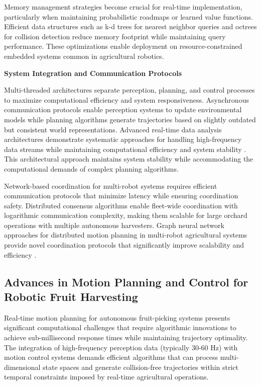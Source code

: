 \documentclass{ieeeaccess}
\begin{document}
Memory management strategies become crucial for real-time implementation, particularly when maintaining probabilistic roadmaps or learned value functions. Efficient data structures such as k-d trees for nearest neighbor queries and octrees for collision detection reduce memory footprint while maintaining query performance. These optimizations enable deployment on resource-constrained embedded systems common in agricultural robotics.

\textbf{System Integration and Communication Protocols}

Multi-threaded architectures separate perception, planning, and control processes to maximize computational efficiency and system responsiveness. Asynchronous communication protocols enable perception systems to update environmental models while planning algorithms generate trajectories based on slightly outdated but consistent world representations. Advanced real-time data analysis architectures demonstrate systematic approaches for handling high-frequency data streams while maintaining computational efficiency and system stability \cite{10497583}. This architectural approach maintains system stability while accommodating the computational demands of complex planning algorithms.

Network-based coordination for multi-robot systems requires efficient communication protocols that minimize latency while ensuring coordination safety. Distributed consensus algorithms enable fleet-wide coordination with logarithmic communication complexity, making them scalable for large orchard operations with multiple autonomous harvesters. Graph neural network approaches for distributed motion planning in multi-robot agricultural systems provide novel coordination protocols that significantly improve scalability and efficiency .

\subsection{Advances in Motion Planning and Control for Robotic Fruit Harvesting}

Real-time motion planning for autonomous fruit-picking systems presents significant computational challenges that require algorithmic innovations to achieve sub-millisecond response times while maintaining trajectory optimality. The integration of high-frequency perception data (typically 30-60 Hz) with motion control systems demands efficient algorithms that can process multi-dimensional state spaces and generate collision-free trajectories within strict temporal constraints imposed by real-time agricultural operations.
\end{document}
